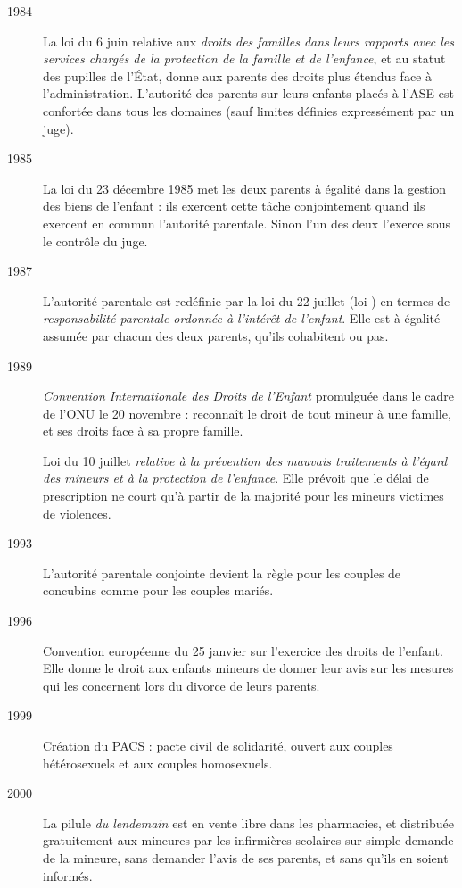\begin{description}
\item[1984] La loi du 6 juin relative aux \emph{droits des familles dans leurs rapports avec les services chargés de la protection de la famille et de l'enfance}, et au statut des pupilles de l'État, donne aux parents des droits plus étendus face à l'administration. L'autorité des parents sur leurs enfants placés à l'ASE est confortée dans tous les domaines (sauf limites définies expressément par un juge).

\item[1985] La loi du 23 décembre 1985 met les deux parents à égalité dans la gestion des biens de l'enfant : ils exercent cette tâche conjointement quand ils exercent en commun l'autorité parentale. Sinon l'un des deux l'exerce sous le contrôle du juge.

\item[1987] L'autorité parentale est redéfinie par la loi du 22 juillet (loi ) en termes de \emph{responsabilité parentale ordonnée à l'intérêt de l'enfant}. Elle est à égalité assumée par chacun des deux parents, qu'ils cohabitent ou pas.

\item[1989] \emph{Convention Internationale des Droits de l'Enfant} promulguée dans le cadre de l'ONU le 20 novembre : reconnaît le droit de tout mineur à une famille, et ses droits face à sa propre famille.

Loi du 10 juillet \emph{relative à la prévention des mauvais traitements à l'égard des mineurs et à la protection de l'enfance}. Elle prévoit que le délai de prescription ne court qu'à partir de la majorité pour les mineurs victimes de violences.

\item[1993] L'autorité parentale conjointe devient la règle pour les couples de concubins comme pour les couples mariés.

\item[1996] Convention européenne du 25 janvier sur l'exercice des droits de l'enfant. Elle donne le droit aux enfants mineurs de donner leur avis sur les mesures qui les concernent lors du divorce de leurs parents.

\item[1999] Création du PACS : pacte civil de solidarité, ouvert aux couples hétérosexuels et aux couples homosexuels.

\item[2000] La pilule {\emph{du lendemain}} est en vente libre dans les pharmacies, et distribuée gratuitement aux mineures par les infirmières scolaires sur simple demande de la mineure, sans demander l'avis de ses parents, et sans qu'ils en soient informés.


\end{description}
